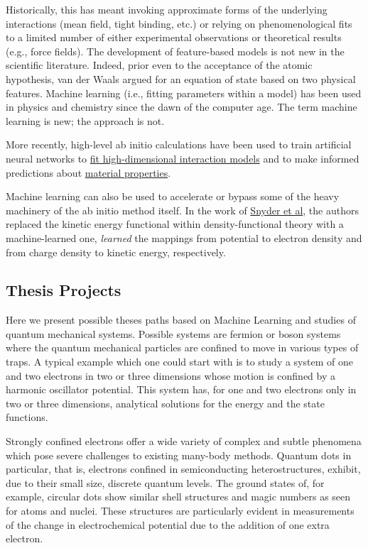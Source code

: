 \documentclass[%
oneside,                 %
final,                   %
10pt]{article}
\begin{document}
Historically, this has meant invoking
approximate forms of the underlying interactions (mean field, tight
binding, etc.) or relying on phenomenological fits to a limited number
of either experimental observations or theoretical results (e.g., force fields). 
The development of feature-based models is not
new in the scientific literature. Indeed, prior even to the acceptance
of the atomic hypothesis, van der Waals argued for an equation of
state based on two physical features. Machine learning (i.e.,
fitting parameters within a model) has been used in physics and
chemistry since the dawn of the computer age. The term machine
learning is new; the approach is not.

More recently, high-level ab initio calculations have been used to
train artificial neural networks to \href{{http://www.sciencedirect.com/science/article/pii/S0927025615007806?via%
models}  and to make informed predictions about \href{{https://www.nature.com/articles/srep40827}}{material properties}. 

Machine learning can also be used to accelerate or bypass some of the
heavy machinery of the ab initio method itself. In the work of \href{{https://journals.aps.org/prl/abstract/10.1103/PhysRevLett.108.253002}}{Snyder et al},  the authors
replaced the kinetic energy functional within density-functional
theory with a machine-learned one, 
\emph{learned} the mappings from potential to electron density and from
charge density to kinetic energy, respectively.

\subsection{Thesis Projects}

Here we present possible theses paths based on Machine Learning and
studies of quantum mechanical systems.  Possible systems are fermion
or boson systems where the quantum mechanical particles are confined
to move in various types of traps. A typical example which one could
start with is to study a system of one and two electrons in two or three
dimensions whose motion is confined by a harmonic  oscillator potential. This
system has, for one and two electrons only in two or three dimensions,
analytical solutions for the energy and the state
functions. 


Strongly confined electrons offer a wide variety of complex and subtle
phenomena which pose severe challenges to existing many-body methods.
Quantum dots in particular, that is, electrons confined in
semiconducting heterostructures, exhibit, due to their small size,
discrete quantum levels.  The ground states of, for example, circular
dots show similar shell structures and magic numbers as seen for atoms
and nuclei. These structures are particularly evident in measurements
of the change in electrochemical potential due to the addition of one
extra electron.
\end{document}
